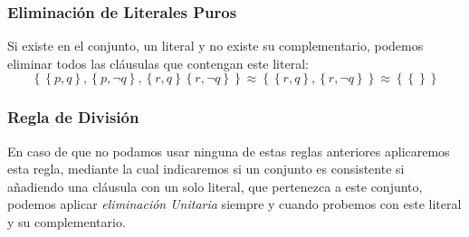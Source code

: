\subsubsection{Eliminación de Literales Puros}
\noindent Si existe en el conjunto, un literal y no existe su complementario, podemos eliminar todos las cláusulas que contengan este literal:
\[
        \boxed{\left \{ \left. \left \{ \left. p,q \right \} \right. ,\left \{ \left. p, \neg q \right \} \right.,\left \{ \left. r,q \right \} \right. \left \{ \left. r, \neg q \right \} \right. \right \} \right. \approx \left \{ \left. \left \{ \left. r,q \right \} \right.,\left \{ \left. r, \neg q \right \} \right. \right \} \right. \approx \left \{ \left. \left \{ \left.  \right \} \right. \right \} \right.}
\]
\subsubsection{Regla de División}
\noindent En caso de que no podamos usar ninguna de estas reglas anteriores aplicaremos esta regla, mediante la cual indicaremos si un conjunto es consistente si añadiendo una cláusula con un solo literal, que pertenezca a este conjunto, podemos aplicar \textit{eliminación Unitaria} siempre y cuando probemos con este literal y su complementario.